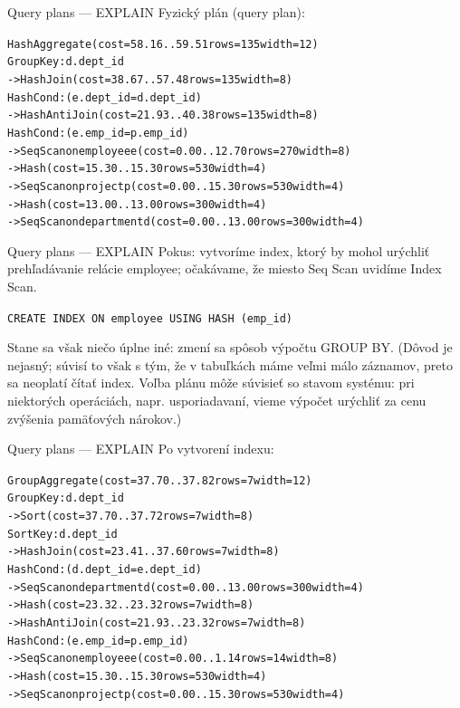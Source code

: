 \documentclass[12pt]{beamer}
\begin{document}
\begin{frame}[fragile]{Query plans --- EXPLAIN}
Fyzický plán (query plan):
\bigskip

\scriptsize
\begin{alltt}
HashAggregate  (cost=58.16..59.51 rows=135 width=12)
  Group Key: d.dept_id
  ->  Hash Join  (cost=38.67..57.48 rows=135 width=8)
        Hash Cond: (e.dept_id = d.dept_id)
        ->  Hash Anti Join  (cost=21.93..40.38 rows=135 width=8)
              Hash Cond: (e.emp_id = p.emp_id)
              ->  Seq Scan on employee e  (cost=0.00..12.70 rows=270 width=8)
              ->  Hash  (cost=15.30..15.30 rows=530 width=4)
                    ->  Seq Scan on project p  (cost=0.00..15.30 rows=530 width=4)
        ->  Hash  (cost=13.00..13.00 rows=300 width=4)
              ->  Seq Scan on department d  (cost=0.00..13.00 rows=300 width=4)
\end{alltt}
\end{frame}

\begin{frame}[fragile]{Query plans --- EXPLAIN}
Pokus: vytvoríme index, ktorý by mohol urýchliť prehľadávanie relácie employee;
očakávame, že miesto Seq Scan uvidíme Index Scan.
\bigskip

\verb|CREATE INDEX ON employee USING HASH (emp_id)|
\bigskip

Stane sa však niečo úplne iné: zmení sa spôsob výpočtu GROUP BY.
(Dôvod je nejasný; súvisí to však s tým, že v tabuľkách máme veľmi málo záznamov,
preto sa neoplatí čítať index. Voľba plánu môže súvisieť so stavom systému:
pri niektorých operáciách, napr. usporiadavaní, vieme výpočet urýchliť za cenu zvýšenia pamäťových nárokov.)
\end{frame}

\begin{frame}[fragile]{Query plans --- EXPLAIN}
Po vytvorení indexu:
\scriptsize
\begin{alltt}
  GroupAggregate  (cost=37.70..37.82 rows=7 width=12)
  Group Key: d.dept_id
  ->  Sort  (cost=37.70..37.72 rows=7 width=8)
        Sort Key: d.dept_id
        ->  Hash Join  (cost=23.41..37.60 rows=7 width=8)
              Hash Cond: (d.dept_id = e.dept_id)
              ->  Seq Scan on department d  (cost=0.00..13.00 rows=300 width=4)
              ->  Hash  (cost=23.32..23.32 rows=7 width=8)
                    ->  Hash Anti Join  (cost=21.93..23.32 rows=7 width=8)
                          Hash Cond: (e.emp_id = p.emp_id)
                          ->  Seq Scan on employee e  (cost=0.00..1.14 rows=14 width=8)
                          ->  Hash  (cost=15.30..15.30 rows=530 width=4)
                                ->  Seq Scan on project p  (cost=0.00..15.30 rows=530 width=4)
\end{alltt}
\end{frame}
\end{document}
